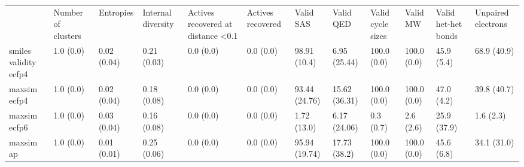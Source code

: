 \begin{tabular}{llllllllllll}
 & Number of clusters & Entropies & Internal diversity & Actives recovered at distance <0.1 & Actives recovered & Valid SAS & Valid QED & Valid cycle sizes & Valid MW & Valid het-het bonds & Unpaired electrons \\
smiles validity ecfp4 & {\cellcolor[HTML]{F6FCFD}} \color[HTML]{000000} 1.0 (0.0) & {\cellcolor[HTML]{F4FBFC}} \color[HTML]{000000} 0.02 (0.04) & {\cellcolor[HTML]{72C7AD}} \color[HTML]{000000} 0.21 (0.03) & {\cellcolor[HTML]{F7FCFD}} \color[HTML]{000000} 0.0 (0.0) & {\cellcolor[HTML]{F7FCFD}} \color[HTML]{000000} 0.0 (0.0) & {\cellcolor[HTML]{00471C}} \color[HTML]{F1F1F1} 98.91 (10.4) & {\cellcolor[HTML]{EDF8FB}} \color[HTML]{000000} 6.95 (25.44) & {\cellcolor[HTML]{8FD4C2}} \color[HTML]{000000} 100.0 (0.0) & {\cellcolor[HTML]{F7FCFD}} \color[HTML]{000000} 100.0 (0.0) & {\cellcolor[HTML]{E9F7FA}} \color[HTML]{000000} 45.9 (5.4) & {\cellcolor[HTML]{006529}} \color[HTML]{F1F1F1} 68.9 (40.9) \\
maxsim ecfp4 & {\cellcolor[HTML]{F6FCFD}} \color[HTML]{000000} 1.0 (0.0) & {\cellcolor[HTML]{F5FBFC}} \color[HTML]{000000} 0.02 (0.04) & {\cellcolor[HTML]{87D0BC}} \color[HTML]{000000} 0.18 (0.08) & {\cellcolor[HTML]{F7FCFD}} \color[HTML]{000000} 0.0 (0.0) & {\cellcolor[HTML]{F7FCFD}} \color[HTML]{000000} 0.0 (0.0) & {\cellcolor[HTML]{005924}} \color[HTML]{F1F1F1} 93.44 (24.76) & {\cellcolor[HTML]{DFF3F4}} \color[HTML]{000000} 15.62 (36.31) & {\cellcolor[HTML]{90D4C3}} \color[HTML]{000000} 100.0 (0.0) & {\cellcolor[HTML]{F7FCFD}} \color[HTML]{000000} 100.0 (0.0) & {\cellcolor[HTML]{87D0BC}} \color[HTML]{000000} 47.0 (4.2) & {\cellcolor[HTML]{2E9756}} \color[HTML]{F1F1F1} 39.8 (40.7) \\
maxsim ecfp6 & {\cellcolor[HTML]{F6FCFD}} \color[HTML]{000000} 1.0 (0.0) & {\cellcolor[HTML]{F6FCFD}} \color[HTML]{000000} 0.03 (0.04) & {\cellcolor[HTML]{9DDACB}} \color[HTML]{000000} 0.16 (0.08) & {\cellcolor[HTML]{F7FCFD}} \color[HTML]{000000} 0.0 (0.0) & {\cellcolor[HTML]{F7FCFD}} \color[HTML]{000000} 0.0 (0.0) & {\cellcolor[HTML]{F5FBFC}} \color[HTML]{000000} 1.72 (13.0) & {\cellcolor[HTML]{EFF9FB}} \color[HTML]{000000} 6.17 (24.06) & {\cellcolor[HTML]{2F9858}} \color[HTML]{F1F1F1} 0.3 (0.7) & {\cellcolor[HTML]{F7FCFD}} \color[HTML]{000000} 2.6 (2.6) & {\cellcolor[HTML]{61BF9E}} \color[HTML]{000000} 25.9 (37.9) & {\cellcolor[HTML]{88D1BD}} \color[HTML]{000000} 1.6 (2.3) \\
maxsim ap & {\cellcolor[HTML]{F6FCFD}} \color[HTML]{000000} 1.0 (0.0) & {\cellcolor[HTML]{F7FCFD}} \color[HTML]{000000} 0.01 (0.01) & {\cellcolor[HTML]{7ACBB3}} \color[HTML]{000000} 0.25 (0.06) & {\cellcolor[HTML]{F7FCFD}} \color[HTML]{000000} 0.0 (0.0) & {\cellcolor[HTML]{F7FCFD}} \color[HTML]{000000} 0.0 (0.0) & {\cellcolor[HTML]{005120}} \color[HTML]{F1F1F1} 95.94 (19.74) & {\cellcolor[HTML]{DBF1F1}} \color[HTML]{000000} 17.73 (38.2) & {\cellcolor[HTML]{D6F0EE}} \color[HTML]{000000} 100.0 (0.0) & {\cellcolor[HTML]{F7FCFD}} \color[HTML]{000000} 100.0 (0.0) & {\cellcolor[HTML]{E7F6F9}} \color[HTML]{000000} 45.6 (6.8) & {\cellcolor[HTML]{95D6C6}} \color[HTML]{000000} 34.1 (31.0) \\

\end{tabular}
